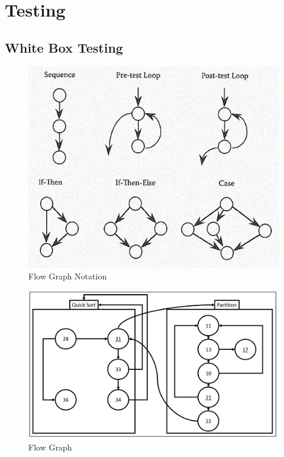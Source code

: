 \documentclass[10pt,a4paper]{article}
\begin{document}
\section{Testing}
\subsection{White Box Testing}

\begin{figure}[h!]
	\centering
	\includegraphics[scale=0.40]{flowgraph.png}
	\caption{Flow Graph Notation}
	\label{Flow Graph Notation}
\end{figure}


\begin{figure}[h!]
	\centering
	\includegraphics[scale=0.80]{graph.png}
	\caption{Flow Graph}
	\label{Flow Graph}
\end{figure}
\end{document}
